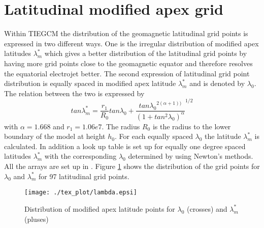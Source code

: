 \section{Latitudinal modified apex grid}\label{cap:latid_grid}
%
Within TIEGCM the distribution of the geomagnetic latitudinal
grid points is expressed in two different ways. 
One is the irregular distribution of modified apex latitudes 
$\lambda_m^*$ which gives a better distribution 
of the latitudinal grid points
by having more grid points  
close to the geomagnetic equator and therefore resolves 
the equatorial electrojet better. 
The second expression of latitudinal grid point distribution
 is equally spaced in 
modified apex latitude $\lambda_m^*$ and is denoted by $\lambda_0$.
The relation between the two is expressed by
%
\begin{equation}
   tan \lambda_m^* = {\frac{r_1}{R_0} tan \lambda_0 + \frac{{tan
   \lambda_0}^{2(\alpha+1))}}{(1+tan^2 \lambda_0)^{\alpha}}}^{1/2}
\end{equation}
%
with $\alpha=1.668$ and $r_1 = 1.06e7$. The radius $R_0$ is the radius to the
lower boundary of the model at height $h_0$. For each equally spaced $\lambda_0$ the
latitude $\lambda_m^*$ is calculated. In addition a look up table is set up 
for equally one degree spaced latitudes 
$\lambda_m^*$ with the corresponding $\lambda_0$ determined by using Newton's
methods. All the arrays are set up in  . Figure
\ref{fig:lambda} shows the distribution of the grid points for $\lambda_0$ and 
$\lambda_m^*$ for 97 latitudinal grid points.
%
\begin{figure}
  \centering
  \texttt{[image: ./tex\_plot/lambda.epsi]}
  \caption{Distribution of modified apex latitude points for $\lambda_0$
  (crosses) and 
  $\lambda_m^*$ (pluses)}
   \label{fig:lambda}
\end{figure}
%

